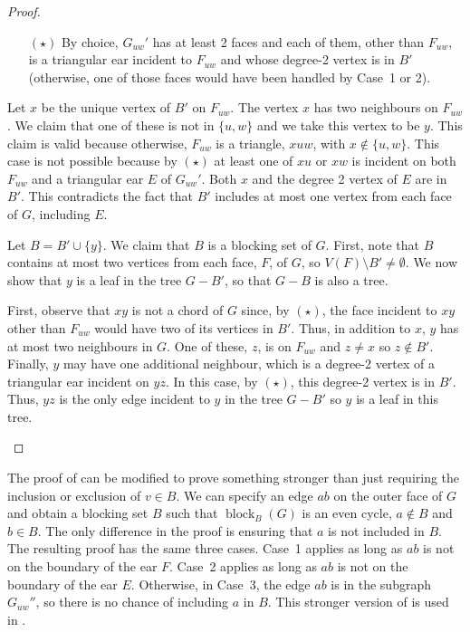 \documentclass{patmorin}
\DeclareMathOperator{\block}{block}
\begin{document}
\begin{proof}
\begin{enumerate}
  \begin{itemize}
  \item[$(\star)$]
  By choice, $G_{uw}'$ has at least 2 faces and each of them, other
  than $F_{uw}$, is a triangular ear incident to $F_{uw}$ and whose
  degree-2 vertex is in $B'$ (otherwise, one of those faces would have
  been handled by Case~1 or 2).
  \end{itemize}

  Let $x$ be the unique vertex of $B'$ on $F_{uw}$. The vertex $x$ has two
  neighbours on $F_{uw}$.  We claim that one of these is not in $\{u,w\}$
  and we take this vertex to be $y$.  This claim is valid because
  otherwise, $F_{uw}$ is a triangle, $xuw$, with $x\not\in\{u,w\}$.
  This case is not possible because by $(\star)$ at least one of $xu$ or
  $xw$ is incident on both $F_{uw}$ and a triangular ear $E$ of $G_{uw}'$.
  Both $x$ and the degree 2 vertex of $E$ are in $B'$.  This contradicts
  the fact that $B'$ includes at most one vertex from each face of $G$,
  including $E$.

  Let $B=B'\cup\{y\}$.  We claim that $B$ is a blocking set of $G$.
  First, note that $B$ contains at most two vertices from each face, $F$,
  of $G$, so $V(F)\setminus B'\neq \emptyset$.  We now show that $y$ is a
  leaf in the tree $G-B'$, so that $G-B$ is also a tree.

  First, observe that $xy$ is not a chord of $G$ since, by $(\star)$,
  the face incident to $xy$ other than $F_{uw}$ would have two of its
  vertices in $B'$.  Thus, in addition to $x$, $y$ has at most two
  neighbours in $G$.  One of these, $z$, is on $F_{uw}$ and $z\neq x$
  so $z\notin B'$.  Finally, $y$ may have one additional neighbour,
  which is a degree-2 vertex of a triangular ear incident on $yz$.
  In this case, by $(\star)$, this degree-2 vertex is in $B'$.  Thus,
  $yz$ is the only edge incident to $y$ in the tree $G-B'$
  so $y$ is a leaf in this tree. \qedhere
\end{enumerate}
\end{proof}

\begin{rem}
   The proof of  can be modified to prove
   something stronger than just requiring the inclusion or exclusion
   of $v\in B$.  We can specify an edge $ab$ on the outer face of $G$
   and obtain a blocking set $B$ such that $\block_B(G)$ is an even
   cycle, $a\not\in B$ and $b\in B$.  The only difference in the proof
   is ensuring that $a$ is not included in $B$. The resulting proof
   has the same three cases. Case~1 applies as long as $ab$ is not on
   the boundary of the ear $F$. Case~2 applies as long as $ab$ is not
   on the boundary of the ear $E$.  Otherwise, in Case~3, the edge $ab$
   is in the subgraph $G_{uw}''$, so there is no chance of including $a$
   in $B$.  This stronger version of  is used
   in .
\end{rem}
\end{document}
